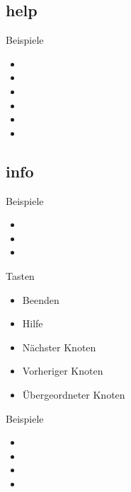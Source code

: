 \documentclass[aspectratio=43]{beamer}
\begin{document}
\subsection{help}
\begin{frame} 

	\begin{exampleblock}{Beispiele } 
	\begin{itemize}
	\item {}
	\item {}
	\item {}
	\item {}
	\item {}
	\item {}
	\end{itemize}
	\end{exampleblock}

\end{frame}
\subsection{info}
\begin{frame} 



	\begin{exampleblock}{Beispiele } 
	\begin{itemize}
	\item {}
	\item {}
	\item {}
	\end{itemize}
	\end{exampleblock}
	
	\begin{block}{ Tasten} 
	\begin{itemize}
	\item {} Beenden
	\item {} Hilfe
	\item {} Nächster Knoten
	\item {} Vorheriger Knoten
	\item {} Übergeordneter Knoten
	\end{itemize}
	\end{block}

\end{frame}

\begin{frame} 
	\begin{exampleblock}{Beispiele } 
	\begin{itemize}
	\item {}
	\item {}
	\item {}
	\item {}
	\end{itemize}
	\end{exampleblock}
	

\end{frame}
\end{document}
